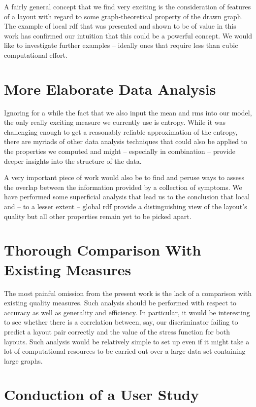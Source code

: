 \documentclass{graphstudy}
\begin{document}
A fairly general concept that we find very exciting is the consideration of features of a layout with regard to some
graph-theoretical property of the drawn graph.  The example of local \acs{rdf} that was presented and shown to be of
value in this work has confirmed our intuition that this could be a powerful concept.  We would like to investigate
further examples -- ideally ones that require less than cubic computational effort.

\section{More Elaborate Data Analysis}

Ignoring for a while the fact that we also input the mean and \ac{rms} into our model, the only really exciting measure
we currently use is entropy.  While it was challenging enough to get a reasonably reliable approximation of the entropy,
there are myriads of other data analysis techniques that could also be applied to the properties we computed and might
-- especially in combination -- provide deeper insights into the structure of the data.

A very important piece of work would also be to find and peruse ways to assess the overlap between the information
provided by a collection of symptoms.  We have performed some superficial analysis that lead us to the conclusion that
local and -- to a lesser extent -- global \ac{rdf} provide a distinguishing view of the layout's quality but all other
properties remain yet to be picked apart.

\section{Thorough Comparison With Existing Measures}

The most painful omission from the present work is the lack of a comparison with existing quality measures.  Such
analysis should be performed with respect to accuracy as well as generality and efficiency.  In particular, it would be
interesting to see whether there is a correlation between, say, our discriminator failing to predict a layout pair
correctly and the value of the stress function for both layouts.  Such analysis would be relatively simple to set up
even if it might take a lot of computational resources to be carried out over a large data set containing large graphs.

\section{Conduction of a User Study}
\end{document}
